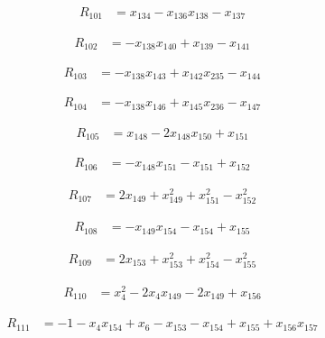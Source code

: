 \begin{align*}
R_{101} &= x_{134} -x_{136} x_{138} -x_{137}
\end{align*}

\begin{align*}
R_{102} &= -x_{138} x_{140} +x_{139} -x_{141}
\end{align*}

\begin{align*}
R_{103} &= -x_{138} x_{143} +x_{142} x_{235} -x_{144}
\end{align*}

\begin{align*}
R_{104} &= -x_{138} x_{146} +x_{145} x_{236} -x_{147}
\end{align*}

\begin{align*}
R_{105} &= x_{148} -2 x_{148} x_{150} +x_{151}
\end{align*}

\begin{align*}
R_{106} &= -x_{148} x_{151} -x_{151} +x_{152}
\end{align*}

\begin{align*}
R_{107} &= 2 x_{149} +x_{149}^{2} +x_{151}^{2} -x_{152}^{2}
\end{align*}

\begin{align*}
R_{108} &= -x_{149} x_{154} -x_{154} +x_{155}
\end{align*}

\begin{align*}
R_{109} &= 2 x_{153} +x_{153}^{2} +x_{154}^{2} -x_{155}^{2}
\end{align*}

\begin{align*}
R_{110} &= x_{4}^{2} -2 x_{4} x_{149} -2 x_{149} +x_{156}
\end{align*}

\begin{align*}
R_{111} &= -1 -x_{4} x_{154} +x_{6} -x_{153} -x_{154} +x_{155} +x_{156} x_{157}
\end{align*}


